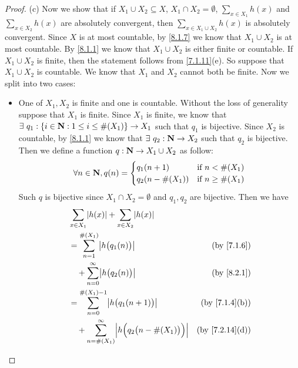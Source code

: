 \begin{proof}{(c)}
  Now we show that if \(X_1 \cup X_2 \subseteq X\), \(X_1 \cap X_2 = \emptyset\), \(\sum_{x \in X_1} h(x)\) and \(\sum_{x \in X_2} h(x)\) are absolutely convergent, then \(\sum_{x \in X_1 \cup X_2} h(x)\) is absolutely convergent.
  Since \(X\) is at most countable, by \cref{8.1.7} we know that \(X_1 \cup X_2\) is at most countable.
  By \cref{8.1.1} we know that \(X_1 \cup X_2\) is either finite or countable.
  If \(X_1 \cup X_2\) is finite, then the statement follows from \cref{7.1.11}(e).
  So suppose that \(X_1 \cup X_2\) is countable.
  We know that \(X_1\) and \(X_2\) cannot both be finite.
  Now we split into two cases:
  \begin{itemize}
    \item One of \(X_1, X_2\) is finite and one is countable.
          Without the loss of generality suppose that \(X_1\) is finite.
          Since \(X_1\) is finite, we know that \(\exists\ q_1 : \{i \in \mathbf{N} : 1 \leq i \leq \#(X_1)\} \to X_1\) such that \(q_1\) is bijective.
          Since \(X_2\) is countable, by \cref{8.1.1} we know that \(\exists\ q_2 : \mathbf{N} \to X_2\) such that \(q_2\) is bijective.
          Then we define a function \(q : \mathbf{N} \to X_1 \cup X_2\) as follow:
          \[
            \forall n \in \mathbf{N}, q(n) = \begin{cases}
              q_1(n + 1)       & \text{if } n < \#(X_1)    \\
              q_2(n - \#(X_1)) & \text{if } n \geq \#(X_1)
            \end{cases}
          \]
          Such \(q\) is bijective since \(X_1 \cap X_2 = \emptyset\) and \(q_1, q_2\) are bijective.
          Then we have
          \begin{align*}
             & \sum_{x \in X_1} \abs{h(x)} + \sum_{x \in X_2} \abs{h(x)}                                                                           \\
             & = \sum_{n = 1}^{\#(X_1)} \abs{h\big(q_1(n)\big)}                                                     & \text{(by \cref{7.1.6})}     \\
             & \quad + \sum_{n = 0}^\infty \abs{h\big(q_2(n)\big)}                                                  & \text{(by \cref{8.2.1})}     \\
             & = \sum_{n = 0}^{\#(X_1) - 1} \abs{h\big(q_1(n + 1)\big)}                                             & \text{(by \cref{7.1.4}(b))}  \\
             & \quad + \sum_{n = \#(X_1)}^\infty \abs{h\Big(q_2\big(n - \#(X_1)\big)\Big)}                          & \text{(by \cref{7.2.14}(d))} \\

\end{align*}
\end{itemize}
\end{proof}
